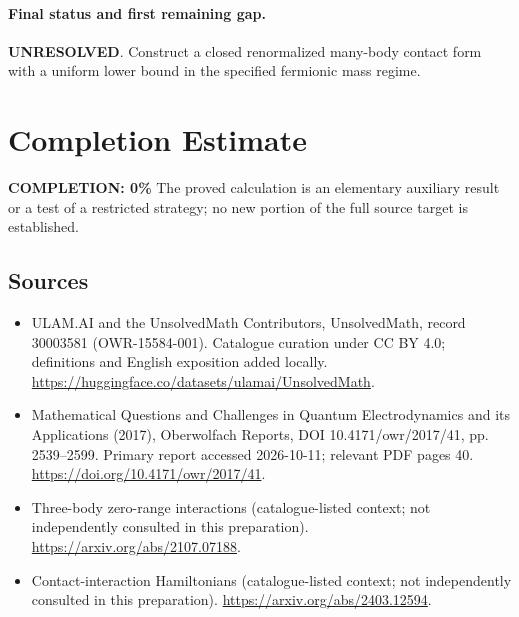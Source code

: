 \documentclass[11pt]{article}
\begin{document}
\paragraph{Final status and first remaining gap.}
\textbf{UNRESOLVED}. Construct a closed renormalized many-body contact form with a uniform lower bound in the specified fermionic mass regime.

\section{Completion Estimate}
\noindent\textbf{COMPLETION: 0\%}
The proved calculation is an elementary auxiliary result or a test of a restricted strategy; no new portion of the full source target is established.

\subsection{Sources}
\begin{itemize}
\item[\hypertarget{source:30003581:1}{S1}] ULAM.AI and the UnsolvedMath Contributors, UnsolvedMath, record 30003581 (OWR-15584-001). Catalogue curation under CC BY 4.0; definitions and English exposition added locally.
\url{https://huggingface.co/datasets/ulamai/UnsolvedMath}.
\item[\hypertarget{source:30003581:2}{S2}] Mathematical Questions and Challenges in Quantum Electrodynamics and its Applications (2017), Oberwolfach Reports, DOI 10.4171/owr/2017/41, pp. 2539--2599. Primary report accessed 2026-10-11; relevant PDF pages 40.
\url{https://doi.org/10.4171/owr/2017/41}.
\item[\hypertarget{source:30003581:3}{S3}] Three-body zero-range interactions (catalogue-listed context; not independently consulted in this preparation).
\url{https://arxiv.org/abs/2107.07188}.
\item[\hypertarget{source:30003581:4}{S4}] Contact-interaction Hamiltonians (catalogue-listed context; not independently consulted in this preparation).
\url{https://arxiv.org/abs/2403.12594}.
\end{itemize}
\label{end:30003581}
\end{document}
